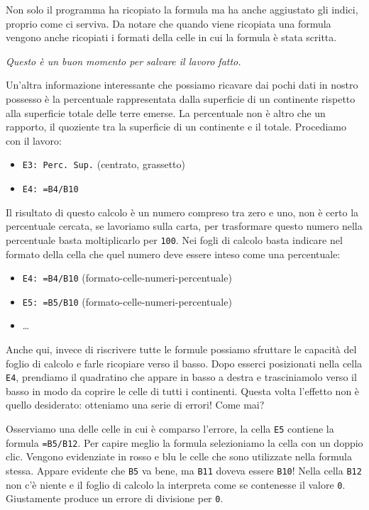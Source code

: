 Non solo il programma ha ricopiato la formula ma ha anche aggiustato gli
indici, proprio come ci serviva.
Da notare che quando viene ricopiata una formula vengono anche ricopiati i
formati della celle in cui la formula è stata scritta.

\emph{Questo è un buon momento per salvare il lavoro fatto.}

Un'altra informazione interessante che possiamo ricavare dai pochi dati in
nostro possesso è la percentuale rappresentata dalla superficie di un
continente rispetto alla superficie totale delle terre emerse.
La percentuale non è altro che un rapporto, il quoziente tra la superficie
di un continente e il totale.
Procediamo con il lavoro:

\begin{itemize} [noitemsep]
\item \texttt{E3: Perc. Sup.} (centrato, grassetto)
\item \texttt{E4: =B4/B10}
\end{itemize}

Il risultato di questo calcolo è un numero compreso tra zero e uno,
non è certo la percentuale cercata,
se lavoriamo sulla carta, per trasformare questo numero nella percentuale
basta moltiplicarlo per \texttt{100}. Nei fogli di calcolo basta indicare nel
formato della cella che quel numero deve essere inteso come una percentuale:

\begin{itemize} [noitemsep]
\item \texttt{E4: =B4/B10}
(formato-celle-numeri-percentuale)
\item \texttt{E5: =B5/B10}
(formato-celle-numeri-percentuale)
\item \dots
\end{itemize}

Anche qui, invece di riscrivere tutte le formule possiamo sfruttare le
capacità del foglio di calcolo e farle ricopiare verso il basso.
Dopo esserci posizionati nella cella \texttt{E4}, prendiamo il quadratino che
appare in basso a destra e trasciniamolo verso il basso in modo da coprire
le celle di tutti i continenti.
Questa volta l'effetto non è quello desiderato:
otteniamo una serie di errori! Come mai?

Osserviamo una delle celle in cui è comparso l'errore, la cella
\texttt{E5} contiene la formula \texttt{=B5/B12}.
Per capire meglio la formula selezioniamo la cella con un doppio clic.
Vengono evidenziate in rosso e blu le celle che sono utilizzate nella formula
stessa.
Appare evidente che \texttt{B5} va bene, ma \texttt{B11} doveva essere 
\texttt{B10}!
Nella cella \texttt{B12} non c'è niente e il foglio di calcolo la interpreta
come se contenesse il valore \texttt{0}.
Giustamente produce un errore di divisione per \texttt{0}.

